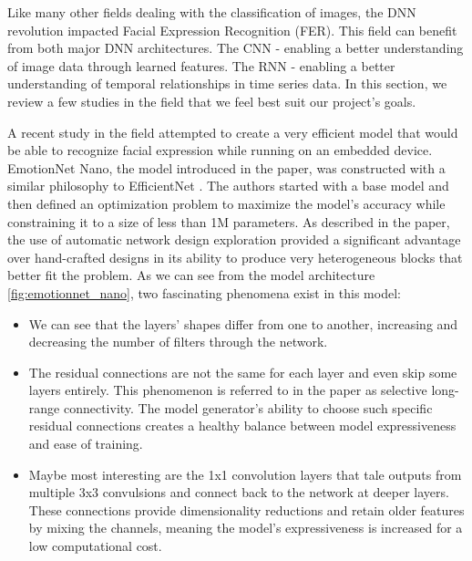 \documentclass[../main.tex]{subfiles}
\begin{document}
Like many other fields dealing with the classification of images, the DNN revolution impacted Facial Expression Recognition (FER).
This field can benefit from both major DNN architectures. The CNN - enabling a better understanding of image data through learned features.
The RNN - enabling a better understanding of temporal relationships in time series data.
In this section, we review a few studies in the field that we feel best suit our project's goals.
\par

A recent study in the field \cite{emotionnet-nano} attempted to create a very efficient model that would be able
to recognize facial expression while running on an embedded device.  EmotionNet Nano, the model introduced in the paper,
was constructed with a similar philosophy to EfficientNet \cite{effnet}. The authors started with a base model and then defined an
optimization problem to maximize the model's accuracy while constraining it to a size of less than 1M parameters.
As described in the paper, the use of automatic network design exploration provided a significant advantage over hand-crafted
designs in its ability to produce very heterogeneous blocks that better fit the problem.
As we can see from the model architecture \ref{fig:emotionnet_nano}, two fascinating phenomena exist in this model:

\begin{samepage}
\begin{itemize}
    \item We can see that the layers' shapes differ from one to another, increasing and decreasing the number of filters through the network.
    \item The residual connections are not the same for each layer and even skip some layers entirely.
        This phenomenon is referred to in the paper as selective long-range connectivity. The model generator's ability to choose such
        specific residual connections creates a healthy balance between model expressiveness and ease of training.
    \item Maybe most interesting are the 1x1 convolution layers that tale outputs from multiple 3x3 convulsions
        and connect back to the network at deeper layers. These connections provide dimensionality reductions and retain older
        features by mixing the channels, meaning the model's expressiveness is increased for a low computational cost.
\end{itemize}
\end{samepage}
\end{document}
